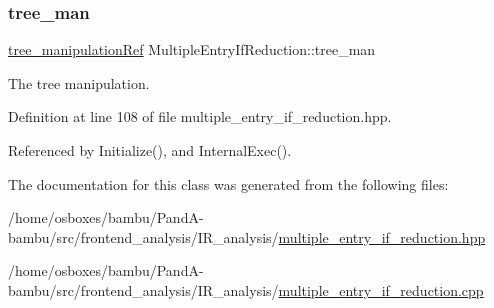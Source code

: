 \subsubsection{\texorpdfstring{tree\+\_\+man}{tree\_man}}
{\footnotesize\ttfamily \hyperlink{tree__manipulation_8hpp_a1a9460e3a2f9fc6a96cfd2f24cc9b2a5}{tree\+\_\+manipulation\+Ref} Multiple\+Entry\+If\+Reduction\+::tree\+\_\+man\hspace{0.3cm}{\ttfamily [private]}}



The tree manipulation. 



Definition at line 108 of file multiple\+\_\+entry\+\_\+if\+\_\+reduction.\+hpp.



Referenced by Initialize(), and Internal\+Exec().



The documentation for this class was generated from the following files\+:\begin{DoxyCompactItemize}
\item 
/home/osboxes/bambu/\+Pand\+A-\/bambu/src/frontend\+\_\+analysis/\+I\+R\+\_\+analysis/\hyperlink{multiple__entry__if__reduction_8hpp}{multiple\+\_\+entry\+\_\+if\+\_\+reduction.\+hpp}\item 
/home/osboxes/bambu/\+Pand\+A-\/bambu/src/frontend\+\_\+analysis/\+I\+R\+\_\+analysis/\hyperlink{multiple__entry__if__reduction_8cpp}{multiple\+\_\+entry\+\_\+if\+\_\+reduction.\+cpp}\end{DoxyCompactItemize}
